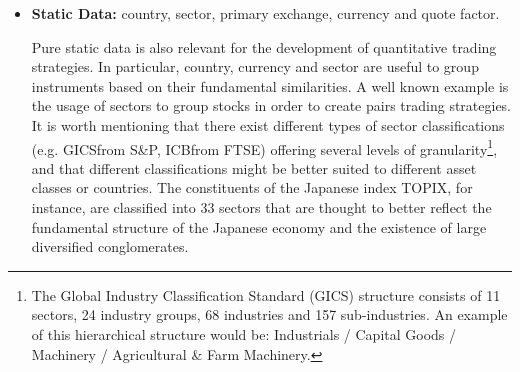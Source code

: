 \begin{itemize}
Mergers \& Acquisitions and Spin-offs are also regular events in the lifecycle of corporations. Their history needs to be recorded in order to account for the resulting changes in valuation that might affect a given ticker or tickers. These situations can also be exploited by trading strategies known as Merger Arbitrage.


Stocks quotation can be suspended as a cooling mechanism (often at the request of the underlying company) to prevent excess price volatility when significant information is about to be released to the market. Depending on the situation, the suspension can be temporary and intraday, or can last for extended periods of time if the market place allows it.\footnote{For instance, it was the case for a large number of companies in China in 2016.} Suspensions result in gaps in time series and are worth keeping track of, as they can impact strategies in backtesting (inability to enter or exit a position, uncertainty in the pricing of composite assets if a given stock has a significant weight in ETFs or Indexes). 
Some markets will also suspend trading if the price swings more than a predefined amount (limit up / limit down situations) for either a period of time or for the remainder of the trading session.


\item \textbf{Static Data:} country, sector, primary exchange, currency and quote factor.


Pure static data is also relevant for the development of quantitative trading strategies. In particular, country, currency and sector are useful to group instruments based on their fundamental similarities. A well known example is the usage of sectors to group stocks in order to create pairs trading strategies. It is worth mentioning that there exist different types of sector classifications (e.g. GICS\textsuperscript\textregistered from S\&P, ICB\textsuperscript\textregistered from FTSE) offering several levels of granularity\footnote{The Global Industry Classification Standard (GICS) structure consists of 11 sectors, 24 industry groups, 68 industries and 157 sub-industries. An example of this hierarchical structure would be: Industrials / Capital Goods / Machinery / Agricultural \& Farm Machinery.}, and that different classifications might be better suited to different asset classes or countries. The constituents of the Japanese index TOPIX, for instance, are classified into 33 sectors that are thought to better reflect the fundamental structure of the Japanese economy and the existence of large diversified conglomerates. 



\end{itemize}
